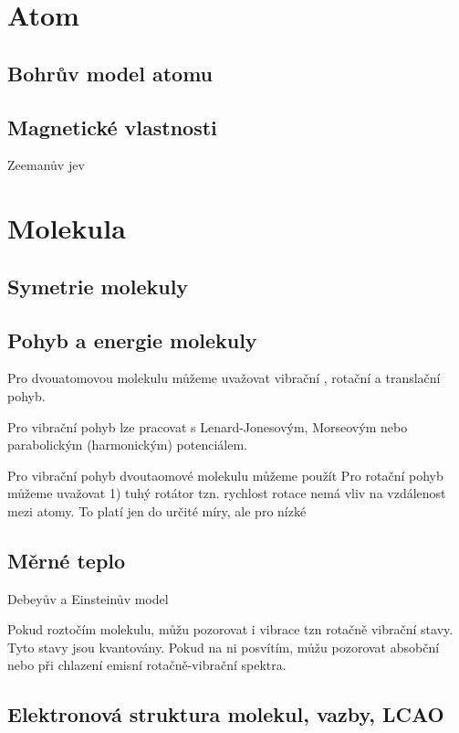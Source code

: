 
\section{Atom}

\subsection{Bohrův model atomu}

\subsection{Magnetické vlastnosti}
Zeemanův jev


\section{Molekula}

\subsection{Symetrie molekuly}

\subsection{Pohyb a energie molekuly}

Pro dvouatomovou molekulu můžeme uvažovat vibrační , rotační  a translační pohyb.

Pro vibrační pohyb lze pracovat s Lenard-Jonesovým, Morseovým nebo parabolickým (harmonickým) potenciálem.


Pro vibrační pohyb dvoutaomové molekulu můžeme použít 
Pro rotační pohyb můžeme uvažovat 1) tuhý rotátor tzn. rychlost rotace nemá vliv na vzdálenost mezi atomy.
To platí jen do určité míry, ale pro nízké 

\subsection{Měrné teplo}

Debeyův a Einsteinův model

Pokud roztočím molekulu, můžu pozorovat i vibrace tzn rotačně vibrační stavy. Tyto stavy jsou kvantovány. Pokud na ni posvítím, můžu pozorovat absobční nebo při chlazení emisní rotačně-vibrační spektra.

\subsection{Elektronová struktura molekul, vazby, LCAO}

